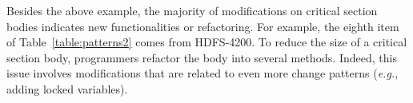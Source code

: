 Besides the above example, the majority of modifications on critical section bodies indicates new functionalities or refactoring. For example, the eighth item of Table~\ref{table:patterns2} comes from HDFS-4200. To reduce the size of a critical section body, programmers refactor the body into several methods. Indeed, this issue involves modifications that are related to even more change patterns (\emph{e.g.}, adding locked variables).










